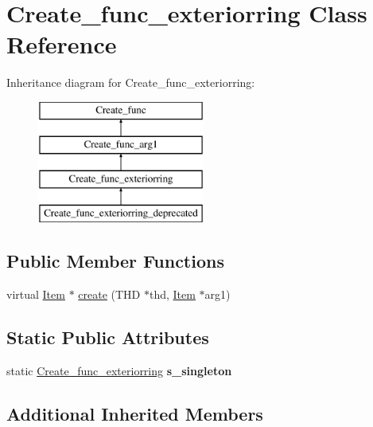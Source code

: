 \hypertarget{classCreate__func__exteriorring}{}\section{Create\+\_\+func\+\_\+exteriorring Class Reference}
\label{classCreate__func__exteriorring}
Inheritance diagram for Create\+\_\+func\+\_\+exteriorring\+:\begin{figure}[H]
\begin{center}
\leavevmode
\includegraphics[height=4.000000cm]{classCreate__func__exteriorring}
\end{center}
\end{figure}
\subsection*{Public Member Functions}
\begin{DoxyCompactItemize}
\item 
virtual \mbox{\hyperlink{classItem}{Item}} $\ast$ \mbox{\hyperlink{classCreate__func__exteriorring_a5c826151baad6fc0e554c5faacbc552a}{create}} (T\+HD $\ast$thd, \mbox{\hyperlink{classItem}{Item}} $\ast$arg1)
\end{DoxyCompactItemize}
\subsection*{Static Public Attributes}
\begin{DoxyCompactItemize}
\item 
\mbox{\label{classCreate__func__exteriorring_a73130bdd83ea25219aab0b4a16ec6498}} 
static \mbox{\hyperlink{classCreate__func__exteriorring}{Create\+\_\+func\+\_\+exteriorring}} {\bfseries s\+\_\+singleton}
\end{DoxyCompactItemize}
\subsection*{Additional Inherited Members}


